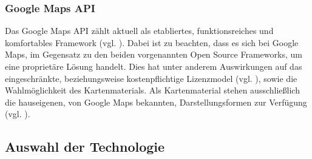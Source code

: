 \documentclass[../Bachelorarbeit.tex]{subfiles}
\begin{document}
\subsubsection{Google Maps \ac{API}}
Das Google Maps \ac{API} zählt aktuell als etabliertes, funktionsreiches und    komfortables Framework (vgl. \cite[Abschnitt: Google Maps]{TestingWebMapApi}).  
Dabei ist zu beachten, dass es sich bei Google Maps, im Gegensatz zu den beiden vorgenannten Open Source Frameworks, um eine proprietäre Lösung handelt. 
Dies hat unter anderem Auswirkungen auf das eingeschränkte, beziehungsweise kostenpflichtige Lizenzmodel (vgl. \cite{GoogleMapsNutzung}), sowie die Wahlmöglichkeit des Kartenmaterials. 
Als Kartenmaterial stehen ausschließlich die hauseigenen, von Google Maps bekannten, Darstellungsformen zur Verfügung (vgl. \cite[Abschnitt: Google Maps]{TestingWebMapApi}). 


\subsection{Auswahl der Technologie}
\label{AuswahlDerTechnologie}
\end{document}

